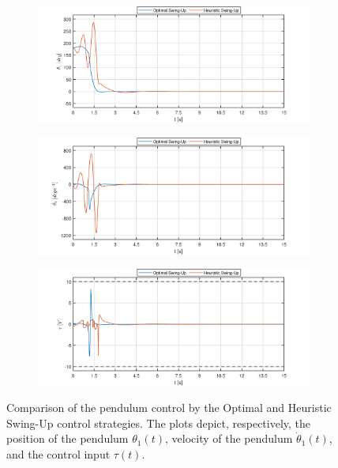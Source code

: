 \begin{figure}[H]
\centering
\begin{subfigure}
	\centering
	\includegraphics[scale=0.6]{images/Dswing/pend.pdf}  
\end{subfigure}
\begin{subfigure}
	\centering
	\includegraphics[scale=0.6]{images/Dswing/dpend.pdf}  
\end{subfigure}
\begin{subfigure}
	\centering
	\includegraphics[scale=0.6]{images/Dswing/control.pdf}  
\end{subfigure}
\caption{Comparison of the pendulum control by the Optimal and Heuristic Swing-Up control strategies. The plots depict, respectively, the position of the pendulum $\theta_1(t)$, velocity of the pendulum $\dot{\theta}_1(t)$, and the control input $\tau(t)$.}
\label{results1}
\end{figure}
